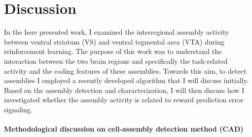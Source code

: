 \chapter{Discussion}
\label{chap:Conclusion}
In the here presented work, I examined the interregional assembly activity between ventral striatum (VS) and ventral tegmental area (VTA) during reinforcement learning. The purpose of this work was to understand the interaction between the two brain regions and specifically the task-related activity and the coding features of these assemblies. Towards this aim, to detect assemblies I employed a recently developed algorithm that I will discuss initially. Based on the assembly detection and characterization, I will then discuss how I investigated whether the assembly activity is related to reward prediction error signaling.
\subsubsection{Methodological discussion on cell-assembly detection method (CAD)}
